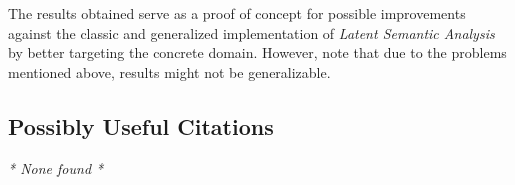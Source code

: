 \documentclass{Paper_Summary}
\begin{document}
    The results obtained serve as a proof of concept for possible improvements against the classic and generalized implementation of \emph{Latent Semantic Analysis} by better targeting the concrete domain. However, note that due to the problems mentioned above, results might not be generalizable.

\breakline

\begin{center}
    \section*{Possibly Useful Citations}
\end{center}
\emph{* None found *}
\end{document}
